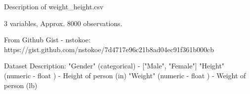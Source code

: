 Description of weight_height.csv

3 variables, Approx. 8000 observations.

From Github Gist - nstokoe: https://gist.github.com/nstokoe/7d4717e96c21b8ad04ec91f361b000cb

Dataset Description:
"Gender" (categorical) - ["Male", "Female"]
"Height" (numeric - float ) - Height of person (in)
"Weight" (numeric - float ) - Weight of person (lb)